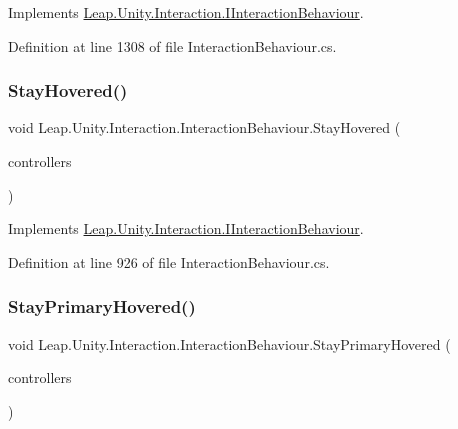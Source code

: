 Implements \mbox{\hyperlink{interface_leap_1_1_unity_1_1_interaction_1_1_i_interaction_behaviour_a8c95d4e968d94cec18ac2038e914931e}{Leap.\+Unity.\+Interaction.\+I\+Interaction\+Behaviour}}.



Definition at line 1308 of file Interaction\+Behaviour.\+cs.

\mbox{\label{class_leap_1_1_unity_1_1_interaction_1_1_interaction_behaviour_a7f9fb570739d3cc9047356abbe21bc44}} 
\subsubsection{\texorpdfstring{StayHovered()}{StayHovered()}}
{\footnotesize\ttfamily void Leap.\+Unity.\+Interaction.\+Interaction\+Behaviour.\+Stay\+Hovered (\begin{DoxyParamCaption}\item[{List$<$ \mbox{\hyperlink{class_leap_1_1_unity_1_1_interaction_1_1_interaction_controller}{Interaction\+Controller}} $>$}]{controllers }\end{DoxyParamCaption})}



Implements \mbox{\hyperlink{interface_leap_1_1_unity_1_1_interaction_1_1_i_interaction_behaviour_ab9d088c65012161b3df47f3057d07e5a}{Leap.\+Unity.\+Interaction.\+I\+Interaction\+Behaviour}}.



Definition at line 926 of file Interaction\+Behaviour.\+cs.

\mbox{\label{class_leap_1_1_unity_1_1_interaction_1_1_interaction_behaviour_a08154671b75a77ec03b101c17cebe0fd}} 
\subsubsection{\texorpdfstring{StayPrimaryHovered()}{StayPrimaryHovered()}}
{\footnotesize\ttfamily void Leap.\+Unity.\+Interaction.\+Interaction\+Behaviour.\+Stay\+Primary\+Hovered (\begin{DoxyParamCaption}\item[{List$<$ \mbox{\hyperlink{class_leap_1_1_unity_1_1_interaction_1_1_interaction_controller}{Interaction\+Controller}} $>$}]{controllers }\end{DoxyParamCaption})}




